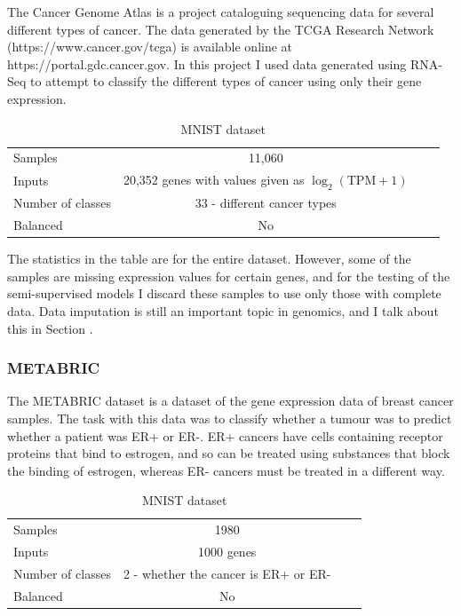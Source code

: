 \documentclass[12pt,a4paper,twoside,openright]{report}
\begin{document}
The Cancer Genome Atlas is a project cataloguing sequencing data for several different types of cancer. The data generated by the TCGA Research 
Network (https://www.cancer.gov/tcga) is available online at https://portal.gdc.cancer.gov. In this project I used data generated using 
RNA-Seq to attempt to classify the different types of cancer using only their gene expression.
\begin{table}[H]
  \label{tab:requirements}
  \small %
  \centering %
  \begin{tabular}{lccr} %
  \toprule[\heavyrulewidth]
  Samples & 11,060 \\
  Inputs & 20,352 genes with values given as $\log_{2}(\text{TPM}+1)$ \footnotemark \\
  Number of classes & 33 - different cancer types\\
  Balanced & No \\
  \bottomrule[\heavyrulewidth] 
  \end{tabular}
  \caption{MNIST dataset} 
\end{table}

The statistics in the table are for the entire dataset. However, some of the samples are missing expression values for certain genes, and 
for the testing of the semi-supervised models I discard these samples to use only those with complete data. Data imputation is still an 
important topic in genomics, and I talk about this in Section .

\subsubsection{METABRIC}

The METABRIC dataset is a dataset of the gene expression data of breast cancer samples. The task with this data was to classify whether 
a tumour was to predict whether a patient was ER+ or ER-. ER+ cancers have cells containing receptor proteins that bind to estrogen, 
and so can be treated using substances that block the binding of estrogen, whereas ER- cancers must be treated in a different way.
\begin{table}[H]
  \label{tab:requirements}
  \small %
  \centering %
  \begin{tabular}{lccr} %
  \toprule[\heavyrulewidth]
  Samples & 1980 \\
  Inputs & 1000 genes \\
  Number of classes & 2 - whether the cancer is ER+ or ER- \\
  Balanced & No \\
  \bottomrule[\heavyrulewidth] 
  \end{tabular}
  \caption{MNIST dataset} 
\end{table}
\end{document}
